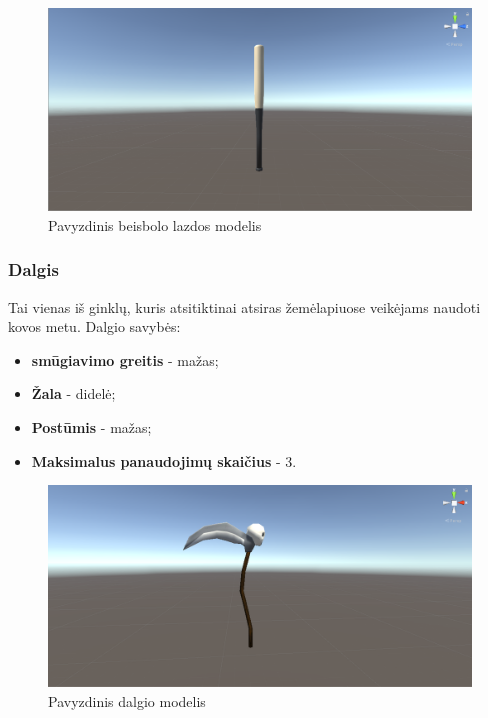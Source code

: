 \documentclass{VUMIFPSkursinis}
\begin{document}
\begin{figure}[H]
    \centering
    \includegraphics[scale=0.3]{img/Weapons/Baseball_bat.png}
    \caption{Pavyzdinis beisbolo lazdos modelis}
    \label{img:baseballbat}
\end{figure}

\subsubsection{Dalgis}
Tai vienas iš ginklų, kuris atsitiktinai atsiras žemėlapiuose veikėjams naudoti kovos metu. Dalgio savybės:
\begin{itemize}
    \item \textbf{smūgiavimo greitis} - mažas;
    \item \textbf{Žala} - didelė;
    \item \textbf{Postūmis} - mažas;
    \item \textbf{Maksimalus panaudojimų skaičius} - 3.
\end{itemize}

\begin{figure}[H]
    \centering
    \includegraphics[scale=0.3]{img/Weapons/Scythe.png}
    \caption{Pavyzdinis dalgio modelis}
    \label{img:scythe}
\end{figure}
\end{document}
